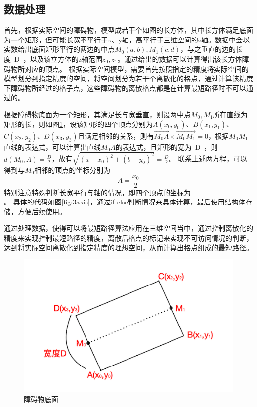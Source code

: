 \subsection{数据处理}
\par 首先，根据实际空间的障碍物，模型成若干个如图的长方体，其中长方体满足底面为一个矩形，但可能长宽不平行于x、y轴，高平行于三维空间的z轴。数据中会以实数给出底面矩形平行的两边的中点$M_0(a,b),M_1(c,d)$，与之垂直的边的长度~D~，以及该立方体的z轴范围$z_0,z_1$。通过给出的数据可以计算得出该长方体障碍物所对应的顶点。
根据实际空间模型，需要首先按照指定的精度将实际空间的模型划分到指定精度的空间，将空间划分为若干个离散化的格点，通过计算该精度下障碍物所经过的格子点，这些障碍物的离散格点都是在计算最短路径时不可以通过的。
\par 根据障碍物底面为一个矩形，其满足长与宽垂直，则设两中点$M_0,M_1$所在直线为矩形的长，则如图\ref{fig:obstacle_bottom}，设该矩形的四个顶点分别为$A(x_0,y_0)$、$B(x_1,y_1)$、$C(x_2,y_2)$、$D(x_3,y_3)$且满足相邻的关系，则有$\vec{M_0A}\times\vec{M_0M_1}=0$，根据$M_0M_1$直线的表达式，可以计算出直线$M_0A$的表达式，且矩形的宽为~D~，则$d(M_0,A)=\frac{D}{2}$，故有$\sqrt{(a-x_0)^2+(b-y_0)^2}=\frac{D}{2}$。
联系上述两方程，可以得到与$M_0$相邻的顶点的坐标分别为$$A=\dfrac{x_0}{2}$$特别注意特殊判断长宽平行与轴的情况，即四个顶点的坐标为$$$$。
具体的代码如图\ref{fig:3axis}，通过if-else判断情况来具体计算，最后使用结构体存储，方便后续使用。
\par 通过处理数据，使得可以将最短路径算法应用在三维空间当中，通过控制离散化的精度来实现控制最短路径的精度，离散后格点的标记来实现不可访问情况的判断，达到将实际空间离散化到指定精度的理想空间，从而计算出格点组成的最短路径。
\begin{figure}[h]
    \centering
    \includegraphics[width=12cm]{figures/obstacle_bottom.png}
    \caption{障碍物底面}
    \label{fig:obstacle_bottom}
\end{figure}

